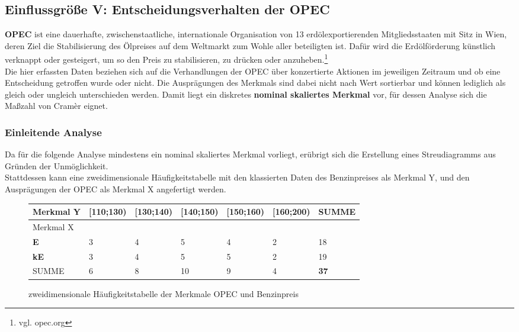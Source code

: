 \subsection{Einflussgröße V: Entscheidungsverhalten der OPEC}
\textbf{OPEC} ist eine dauerhafte, zwischenstaatliche, internationale Organisation von 13 erdölexportierenden Mitgliedsstaaten mit Sitz in Wien, deren Ziel die Stabilisierung des Ölpreises auf dem Weltmarkt zum Wohle aller beteiligten ist. Dafür wird die Erdölförderung künstlich verknappt oder gesteigert, um so den Preis zu stabilisieren, zu drücken oder anzuheben.\footnote{vgl. opec.org}\\
Die hier erfassten Daten beziehen sich auf die Verhandlungen der OPEC über konzertierte Aktionen im jeweiligen Zeitraum und ob eine Entscheidung getroffen wurde oder nicht. Die Ausprägungen des Merkmals sind dabei nicht nach Wert sortierbar und können lediglich als gleich oder ungleich unterschieden werden. Damit liegt ein diskretes \textbf{nominal skaliertes Merkmal} vor, für dessen Analyse sich die Maßzahl von Cramèr eignet.

\subsubsection{Einleitende Analyse}
Da für die folgende Analyse mindestens ein nominal skaliertes Merkmal vorliegt, erübrigt sich die Erstellung eines Streudiagramms aus Gründen der Unmöglichkeit.\\
Stattdessen kann eine zweidimensionale Häufigkeitstabelle mit den klassierten Daten des Benzinpreises als Merkmal Y, und den Ausprägungen der OPEC als Merkmal X angefertigt werden.


\begin{figure}[H]
\centering
\small
\begin{tabular}{l|lllll|l}
Merkmal Y   & \textbf{{[}110;130)} & \textbf{{[}130;140)} & \textbf{{[}140;150)} & \textbf{{[}150;160)} & \textbf{{[}160;200)} & SUMME       \\ \hline
Merkmal X   &                      &                      &                      &                      &                      &             \\
\textbf{E}  & 3                    & 4                    & 5                    & 4                    & 2                    & 18          \\
\textbf{kE} & 3                    & 4                    & 5                    & 5                    & 2                    & 19          \\ \hline
SUMME       & 6                    & 8                    & 10                   & 9                    & 4                    & \textbf{37}
\end{tabular}
\caption{zweidimensionale Häufigkeitstabelle der Merkmale OPEC und Benzinpreis}
\end{figure}

